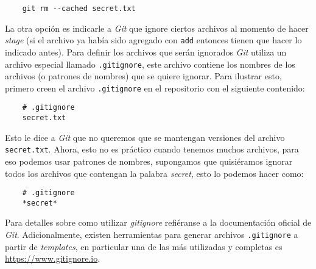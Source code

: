   \begin{verbatim}
    git rm --cached secret.txt
  \end{verbatim}

  La otra opción es indicarle a \textit{Git} que ignore ciertos archivos al momento de hacer 
  \textit{stage} (si el archivo ya había sido agregado con \texttt{add} entonces tienen que hacer lo
  indicado antes).
  Para definir los archivos que serán ignorados \textit{Git} utiliza un archivo especial llamado 
  \texttt{.gitignore}, este archivo contiene los nombres de los archivos (o patrones de nombres) que
  se quiere ignorar.
  Para ilustrar esto, primero creen el archivo \texttt{.gitignore} en el repositorio con el 
  siguiente contenido:

  \begin{verbatim}
    # .gitignore
    secret.txt
  \end{verbatim}

  Esto le dice a \textit{Git} que no queremos que se mantengan versiones del archivo 
  \texttt{secret.txt}.
  Ahora, esto no es práctico cuando tenemos muchos archivos, para eso podemos usar patrones de 
  nombres, supongamos que quisiéramos ignorar todos los archivos que contengan la palabra 
  \textit{secret}, esto lo podemos hacer como:

  \begin{verbatim}
    # .gitignore
    *secret*
  \end{verbatim}

  Para detalles sobre como utilizar \textit{gitignore} refiéranse a la documentación oficial de 
  \textit{Git}\autocite{gitignore}.
  Adicionalmente, existen herramientas para generar archivos \texttt{.gitignore} a partir de 
  \textit{templates}, en particular una de las más utilizadas y completas es 
  \url{https://www.gitignore.io}.
%